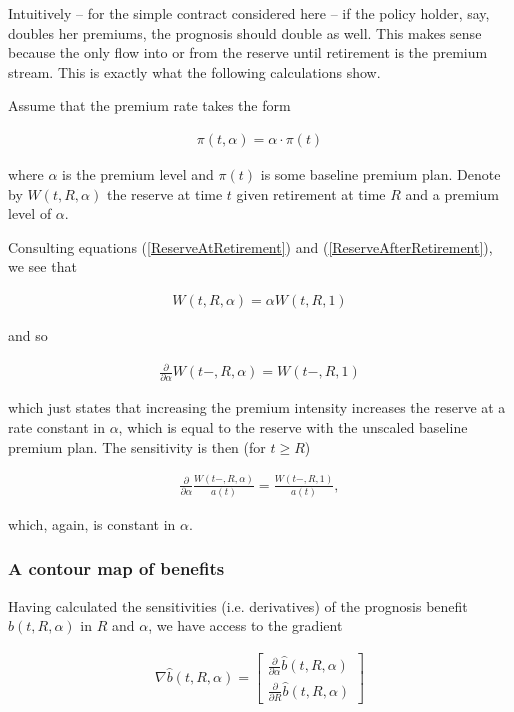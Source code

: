 \documentclass{article}
\newcommand{\1}[1]{\mathbbm{1}_{\left\lbrace #1 \right\rbrace}}
\theoremstyle{break}
\theoremstyle{remark}
\numberwithin{equation}{section}
\begin{document}
Intuitively -- for the simple contract considered here -- if the policy holder, say, doubles her premiums, the prognosis should double as well. This makes sense because the only flow into or from the reserve until retirement is the premium stream. This is exactly what the following calculations show.

Assume that the premium rate takes the form

\begin{align*}
	\pi (t,\alpha) = \alpha \cdot \pi(t)
\end{align*}

where $\alpha$ is the premium level and $\pi(t)$ is some baseline premium plan. Denote by $W(t,R,\alpha)$ the reserve at time $t$ given retirement at time $R$ and a premium level of $\alpha$.

Consulting equations (\ref{ReserveAtRetirement}) and (\ref{ReserveAfterRetirement}), we see that

\begin{align*}
	W(t,R,\alpha) = \alpha W(t,R,1)
\end{align*}

and so

\begin{align} \label{AlphaDeriv}
	\frac{\partial}{\partial \alpha }W(t-,R,\alpha) = W(t-,R,1)
\end{align}

which just states that increasing the premium intensity increases the reserve at a rate constant in $\alpha$, which is equal to the reserve with the unscaled baseline premium plan. The sensitivity is then (for $t \geq R$)

\begin{align} \label{ResDeriv}
	\frac{\partial}{\partial \alpha }\frac{W(t-,R,\alpha)}{a(t)} = \frac{W(t-,R,1)}{a(t)},
\end{align}

which, again, is constant in $\alpha$.

\subsubsection{A contour map of benefits}

Having calculated the sensitivities (i.e. derivatives) of the prognosis benefit $\hat{b}(t,R,\alpha)$ in $R$ and $\alpha$, we have access to the gradient

\begin{align*}
	\nabla \hat{b}(t,R,\alpha) =
	\begin{bmatrix}
		\frac{\partial}{\partial \alpha }\hat{b}(t,R,\alpha) \\
		\frac{\partial}{\partial R }\hat{b}(t,R,\alpha)
	\end{bmatrix}
\end{align*}
\end{document}
